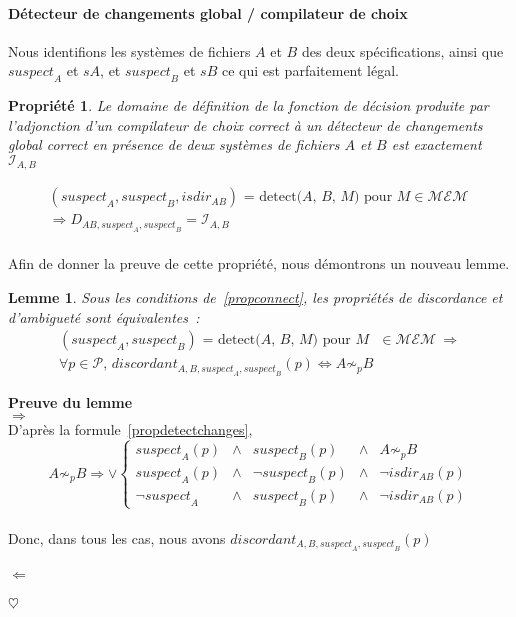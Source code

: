 \documentclass[11pt]{report}
\newtheorem{lemme}{Lemme}
\newtheorem{propri}{Propri\'et\'e}
\newcommand{\mem}{\ensuremath{\mathcal{MEM}}}
\newcommand{\infl}[2]{\ensuremath{\mathcal{I}_{#1,#2}}}
\newcommand{\sus}[1]{\ensuremath{\mathit{suspect}_{#1}}}
\newcommand{\isdira}[2]{\ensuremath{\mathit{isdir}_{#1#2}}}
\newcommand{\preuve}[2]{\textbf{Preuve #1} \\
#2\\
$\heartsuit$\\}
\newcommand{\prop}[3]{
\begin{propri}
#1
\end{propri}
\begin{equation} \label{#2}
#3
\end{equation}\\}
\begin{document}
{\paragraph{D\'etecteur de changements global / compilateur de choix\\}
Nous identifions les syst\`emes de fichiers $A$ et $B$ des deux 
sp\'ecifications, ainsi que \sus{A} et $sA$, et \sus{B} et $sB$ ce qui est 
parfaitement l\'egal.
\prop{Le domaine de d\'efinition de la fonction de d\'ecision produite par l'adjonction 
d'un compilateur de choix correct \`a un d\'etecteur de changements global correct en pr\'esence de 
deux syst\`emes de fichiers $A$ et $B$ est exactement~\infl{A}{B}}
{propconnect}
{\begin{array}{l}
(\sus{A}, \sus{B}, \isdira{A}{B}) \mbox{\ = detect($A$, $B$, $M$) pour $M$} \in \mem\ \\
\Rightarrow D_{AB, \sus{A}, \sus{B}} = \infl{A}{B}
\end{array}}
Afin de donner la preuve de cette propri\'et\'e, nous d\'emontrons un nouveau lemme.
\begin{lemme}
Sous les conditions de~\ref{propconnect}, les propri\'et\'es de discordance et d'ambiguet\'e sont
\'equivalentes~:\\
\[
\begin{array}{l}
 (\sus{A}, \sus{B}) \mbox{\ = detect($A$, $B$, $M$) pour $M$ } \in \mem\ \Rightarrow\\
 \forall p \in \mathcal{P} \mbox{, \ } \mathit{discordant}_{A, B, \sus{A},
 \sus{B}}(p) \Leftrightarrow A \not\sim_{p} B
\end{array} 
\]
\end{lemme}
\preuve{du lemme}{
\mbox{\large $\Rightarrow$}\\
D'apr\`es la formule~\ref{propdetectchanges},\\
\[
A \not\sim_{p} B \Rightarrow \vee \left\{ 
\begin{array}{lllll}
 \sus{A}(p) & \wedge & \sus{B}(p) & \wedge & A \not\sim_{p} B\\
 \sus{A}(p) & \wedge & \neg \sus{B}(p) & \wedge & \neg \isdira{A}{B}(p) \\
 \neg \sus{A} & \wedge & \sus{B}(p) & \wedge & \neg \isdira{A}{B}(p)
\end{array} \right.
\] \\
Donc, dans tous les cas, nous avons $\mathit{discordant}_{A, B, \sus{A}, \sus{B}}(p)$ \\\\
\mbox{\large $\Leftarrow$}\\
}}
\end{document}
